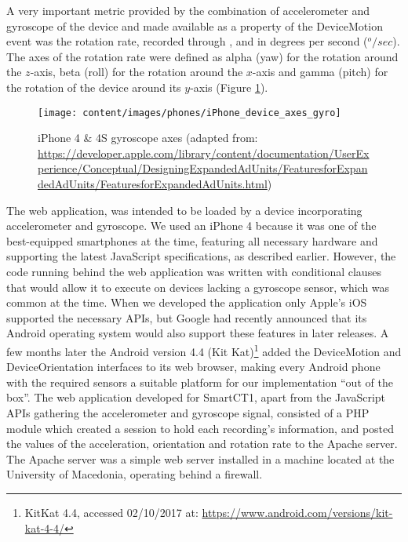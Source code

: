 A very important metric provided by the combination of accelerometer and gyroscope of the device and made available as a property of the DeviceMotion event was the rotation rate, recorded through ,  and  in degrees per second ($^{o}/sec$). The axes of the rotation rate were defined as alpha (yaw) for the rotation around the $z$-axis, beta (roll) for the rotation around the $x$-axis and gamma (pitch) for the rotation of the device around its $y$-axis (Figure \ref{fig:iphoneAxesGyro}). 

\begin{figure}[h]
	\centering
	\texttt{[image: content/images/phones/iPhone\_device\_axes\_gyro]}
	\caption{iPhone 4 \& 4S gyroscope axes (adapted from: \url{https://developer.apple.com/library/content/documentation/UserExperience/Conceptual/DesigningExpandedAdUnits/FeaturesforExpandedAdUnits/FeaturesforExpandedAdUnits.html})}
	\label{fig:iphoneAxesGyro}
\end{figure}

The web application, was intended to be loaded by a device incorporating accelerometer and gyroscope. We used an iPhone 4 because it was one of the best-equipped smartphones at the time, featuring all necessary hardware and supporting the latest JavaScript specifications, as described earlier. However, the code running behind the web application was written with conditional clauses that would allow it to execute on devices lacking a gyroscope sensor, which was common at the time. When we developed the application only Apple's iOS supported the necessary \gls{API}s, but Google had recently announced that its Android operating system would also support these features in later releases. A few months later the Android version 4.4 (Kit Kat)\footnote{KitKat 4.4, accessed 02/10/2017 at: \url{https://www.android.com/versions/kit-kat-4-4/}} added the DeviceMotion and DeviceOrientation interfaces to its web browser, making every Android phone with the required sensors a suitable platform for our implementation ``out of the box''. The web application developed for \gls{SmartCT1}, apart from the JavaScript \gls{API}s gathering the accelerometer and gyroscope signal, consisted of a PHP module which created a session to hold each recording's information, and posted the values of the acceleration, orientation and rotation rate to the Apache server. The Apache server was a simple web server installed in a machine located at the University of Macedonia, operating behind a firewall. 

